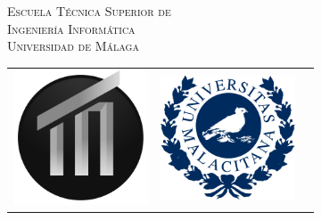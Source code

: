 

\begin{titlepage}
  \begin{center}
    \Large {\textsc{\textsf{
    Escuela Técnica Superior de\\
    Ingeniería Informática\\
    Universidad de Málaga}  }}
  \end{center}
  
  \bigskip
  
  \begin{center}
    \begin{tabular}{lcr}
      \includegraphics[width=4cm,keepaspectratio]{graphs/EscudoETSII.pdf} & \hspace{2cm}
      \includegraphics[width=4cm,keepaspectratio]{graphs/UnivMalacitana.pdf}
    \end{tabular}
  \end{center}
  

\end{titlepage}
